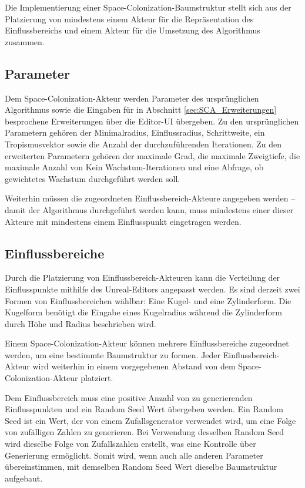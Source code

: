 Die Implementierung einer Space-Colonization-Baumstruktur stellt sich aus der Platzierung von mindestens einem Akteur für die Repräsentation des Einflussbereichs und einem Akteur für die Umsetzung des Algorithmus zusammen.

\subsection{Parameter}

Dem Space-Colonization-Akteur werden Parameter des ursprünglichen Algorithmus sowie die Eingaben für in Abschnitt \ref{sec:SCA_Erweiterungen} besprochene Erweiterungen über die Editor-UI übergeben. Zu den ursprünglichen Parametern gehören der Minimalradius, Einflussradius, Schrittweite, ein Tropismusvektor sowie die Anzahl der durchzuführenden Iterationen. Zu den erweiterten Parametern gehören der maximale Grad, die maximale Zweigtiefe, die maximale Anzahl von \glqq Kein Wachstum\grqq{}-Iterationen und eine Abfrage, ob gewichtetes Wachstum durchgeführt werden soll.

Weiterhin müssen die zugeordneten Einflussbereich-Akteure angegeben werden -- damit der Algorithmus durchgeführt werden kann, muss mindestens einer dieser Akteure mit mindestens einem Einflusspunkt eingetragen werden.

\subsection{Einflussbereiche}

Durch die Platzierung von Einflussbereich-Akteuren kann die Verteilung der Einflusspunkte mithilfe des Unreal-Editors angepasst werden. Es sind derzeit zwei Formen von Einflussbereichen wählbar: Eine Kugel- und eine Zylinderform. Die Kugelform benötigt die Eingabe eines Kugelradius während die Zylinderform durch Höhe und Radius beschrieben wird. 

Einem Space-Colonization-Akteur können mehrere Einflussbereiche zugeordnet werden, um eine bestimmte Baumstruktur zu formen. Jeder Einflussbereich-Akteur wird weiterhin in einem vorgegebenen Abstand von dem Space-Colonization-Akteur platziert.

Dem Einflussbereich muss eine positive Anzahl von zu generierenden Einflusspunkten und ein Random Seed Wert übergeben werden. Ein Random Seed ist ein Wert, der von einem Zufallsgenerator verwendet wird, um eine Folge von zufälligen Zahlen zu generieren. Bei Verwendung desselben Random Seed wird dieselbe Folge von Zufallszahlen erstellt, was eine Kontrolle über Generierung ermöglicht. Somit wird, wenn auch alle anderen Parameter übereinstimmen, mit demselben Random Seed Wert dieselbe Baumstruktur aufgebaut. 

